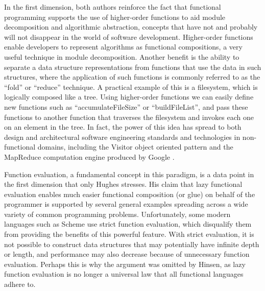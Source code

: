 \documentclass[12pt,letterpaper]{article}
\begin{document}
In the first dimension, 
both authors reinforce the fact that functional programming supports the use of higher-order functions to aid module
decomposition and algorithmic abstraction, concepts that have not and probably will not disappear in the world of 
software development. Higher-order functions enable developers to represent algorithms as functional compositions, a very useful technique in module decomposition. Another benefit is the ability to separate a data structure representations from functions that use the data in such structures, where the application of such functions is commonly referred to as the ``fold'' or ``reduce'' technique. A
practical example of this is a filesystem, which is logically composed like a tree. Using higher-order functions we can easily 
define new functions such as ``accumulateFileSize'' or ``buildFileList'', and pass these functions to another function that 
traverses the filesystem and invokes each one on an element in the tree. In fact, the power of this idea has spread to both
design and architectural software engineering standards and technologies in non-functional domains, including the Visitor 
object oriented pattern \cite{Visitor} and the MapReduce computation engine produced by Google \cite{MapReduce}.

Function evaluation, a fundamental concept in this paradigm, is a data point in the first dimension that only Hughes stresses. His claim that lazy functional evaluation enables much easier functional composition (or glue) on behalf of the 
programmer is supported by several general examples spreading across a wide variety of common programming problems. Unfortunately, some modern languages such as Scheme use strict function evaluation, which disqualify them from providing 
the benefits of this powerful feature. With strict evaluation, it is not possible to construct data structures that may potentially
have infinite depth or length, and performance may also decrease because of unnecessary function evaluation. 
Perhaps this is why the argument was omitted by Hinsen, as lazy function evaluation is no longer a universal
law that all functional languages adhere to. 
\end{document}
